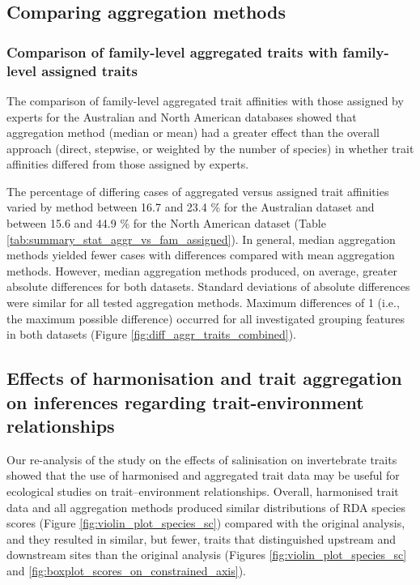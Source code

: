 \documentclass[12pt]{article}
\begin{document}
\subsection*{Comparing aggregation methods} 

\subsubsection*{Comparison of family-level aggregated traits with family-level assigned traits}
\label{sec:diff_trait_agg_chessman}

The comparison of family-level aggregated trait affinities with those assigned by experts for the Australian and North American databases showed that aggregation method (median or mean) had a greater effect than the overall approach (direct, stepwise, or weighted by the number of species) in whether trait affinities differed from those assigned by experts.

The percentage of differing cases of aggregated versus assigned trait affinities varied by method between 16.7 and 23.4 \% for the Australian dataset and between 15.6 and 44.9 \% for the North American dataset (Table \ref{tab:summary_stat_aggr_vs_fam_assigned}). In general, median aggregation methods yielded fewer cases with differences compared with mean aggregation methods. However, median aggregation methods produced, on average, greater absolute differences for both datasets. Standard deviations of absolute differences were similar for all tested aggregation methods. Maximum differences of 1 (i.e., the maximum possible difference) occurred for all investigated grouping features in both datasets (Figure \ref{fig:diff_aggr_traits_combined}).

\newpage


\subsection*{Effects of harmonisation and trait aggregation on inferences regarding trait-environment relationships}

Our re-analysis of the \citet{szocs_effects_2014} study on the effects of salinisation on invertebrate traits showed that the use of harmonised and aggregated trait data may be useful for ecological studies on trait–environment relationships. Overall, harmonised trait data and all aggregation methods produced similar distributions of RDA species scores (Figure \ref{fig:violin_plot_species_sc}) compared with the original analysis, and they resulted in similar, but fewer, traits that distinguished upstream and downstream sites than the original analysis (Figures \ref{fig:violin_plot_species_sc} and \ref{fig:boxplot_scores_on_constrained_axis}).
\end{document}

